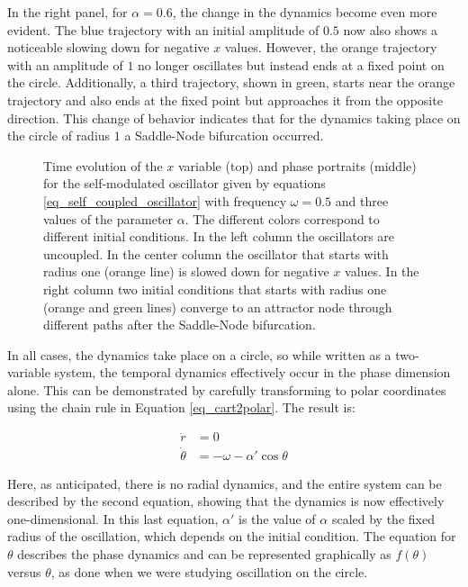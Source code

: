 \documentclass{article}
\begin{document}
In the right panel, for $\alpha = 0.6$, the change in the dynamics become even more evident. 
The blue trajectory with an initial amplitude of $0.5$ now also shows a noticeable slowing down for negative $x$ values. 
However, the orange trajectory with an amplitude of $1$ no longer oscillates but instead ends at a fixed point on the circle. 
Additionally, a third trajectory, shown in green, starts near the orange trajectory and also ends at the fixed point but approaches it from the opposite direction. 
This change of behavior indicates that for the dynamics taking place on the circle of radius $1$ a Saddle-Node bifurcation occurred.

\begin{figure} [h]
    \centerline{}
    \caption{Time evolution of the $x$ variable (top) and phase portraits (middle) for the self-modulated oscillator given by equations \ref{eq_self_coupled_oscillator} with frequency $\omega=0.5$ and three values of the parameter $\alpha$. 
    The different colors correspond to different initial conditions. In the left column the oscillators are uncoupled. In the center column the oscillator that starts with radius one (orange line) is slowed down for negative $x$ values. In the right column two initial conditions that starts with radius one (orange and green lines) converge to an attractor node through different paths after the Saddle-Node bifurcation.
    }
    \label{fig_selfmod}
\end{figure}

In all cases, the dynamics take place on a circle, so while written as a two-variable system, the temporal dynamics effectively occur in the phase dimension alone. This can be demonstrated by carefully transforming to polar coordinates using the chain rule in Equation \ref{eq_cart2polar}. The result is:

\begin{subequations} \label{eq_self_coupled_oscillator_polar}
\begin{align} 
    \dot{r} & = 0 \\
    \dot{\theta} & = -\omega - \alpha' \cos{\theta}
\end{align}
\end{subequations}

Here, as anticipated, there is no radial dynamics, and the entire system can be described by the second equation, showing that the dynamics is now effectively one-dimensional.
In this last equation, $\alpha'$ is the value of $\alpha$ scaled by the fixed radius of the oscillation, which depends on the initial condition. 
The equation for $\theta$ describes the phase dynamics and can be represented graphically as $f(\theta)$ versus $\theta$, as done when we were studying oscillation on the circle.
\end{document}
